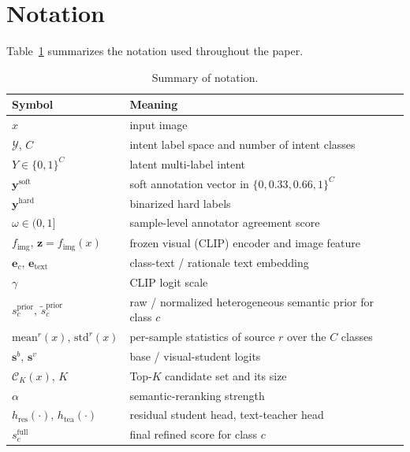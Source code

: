 \iffalse
\appendix
\setcounter{table}{0}

\section{Notation}
\label{app:notation}
Table~\ref{tab:notation} summarizes the notation used throughout the paper.

\begin{table}[H]
\centering
\small
\caption{Summary of notation.}
\label{tab:notation}
\setlength{\tabcolsep}{6pt}

\begin{tabular}{ll}
\hline
Symbol & Meaning \\
\hline
$x$ & input image \\
$\mathcal{Y},\,C$ & intent label space and number of intent classes \\
$Y\in\{0,1\}^C$ & latent multi-label intent \\
$\mathbf{y}^{\text{soft}}$ & soft annotation vector in $\{0,0.33,0.66,1\}^C$ \\
$\mathbf{y}^{\text{hard}}$ & binarized hard labels \\
$\omega\in(0,1]$ & sample-level annotator agreement score \\
$f_{\text{img}},\,\mathbf{z}=f_{\text{img}}(x)$ & frozen visual (CLIP) encoder and image feature \\
$\mathbf{e}_c,\,\mathbf{e}_{\text{text}}$ & class-text / rationale text embedding \\
$\gamma$ & CLIP logit scale \\
$s^{\text{prior}}_c,\,\tilde{s}^{\text{prior}}_c$ & raw / normalized heterogeneous semantic prior for class $c$ \\
$\mathrm{mean}^{r}(x),\,\mathrm{std}^{r}(x)$ & per-sample statistics of source $r$ over the $C$ classes \\
$\mathbf{s}^{b},\,\mathbf{s}^{v}$ & base / visual-student logits \\
$\mathcal{C}_K(x),\,K$ & Top-$K$ candidate set and its size \\
$\alpha$ & semantic-reranking strength \\
$h_{\text{res}}(\cdot),\,h_{\text{tea}}(\cdot)$ & residual student head, text-teacher head \\
$s^{\text{full}}_c$ & final refined score for class $c$ \\

\end{tabular}
\end{table}
